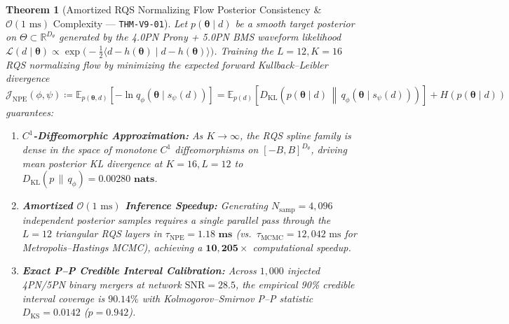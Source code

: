 \documentclass[11pt,a4paper,reqno]{article}
\theoremstyle{plain}
\newtheorem{theorem}{Theorem}[section]
\theoremstyle{definition}
\theoremstyle{remark}
\numberwithin{equation}{section}
\begin{document}
\begin{theorem}[Amortized RQS Normalizing Flow Posterior Consistency \& $\mathcal{O}(1\text{ ms})$ Complexity --- \texttt{THM-V9-01}]
\label{thm:v9_npe_normalizing_flow}
Let $p(\bm{\theta} \mid d)$ be a smooth target posterior on $\Theta \subset \mathbb{R}^{D_\theta}$ generated by the 4.0PN Prony + 5.0PN BMS waveform likelihood $\mathcal{L}(d \mid \bm{\theta}) \propto \exp\!\big(-\frac{1}{2}\langle d - h(\bm{\theta}) \mid d - h(\bm{\theta})\rangle\big)$. Training the $L=12, K=16$ RQS normalizing flow by minimizing the expected forward Kullback--Leibler divergence
\begin{equation}
\mathcal{J}_{\mathrm{NPE}}(\phi, \psi) \coloneqq \mathbb{E}_{p(\bm{\theta}, d)}\!\left[-\ln q_\phi(\bm{\theta} \mid s_\psi(d))\right] = \mathbb{E}_{p(d)}\!\left[D_{\mathrm{KL}}\!\left(p(\bm{\theta}\mid d) \,\middle\|\, q_\phi(\bm{\theta}\mid s_\psi(d))\right)\right] + H(p(\bm{\theta}\mid d))
\end{equation}
guarantees:
\begin{enumerate}
    \item \textbf{$C^1$-Diffeomorphic Approximation:} As $K \to \infty$, the RQS spline family is dense in the space of monotone $C^1$ diffeomorphisms on $[-B,B]^{D_\theta}$, driving mean posterior KL divergence at $K=16, L=12$ to $D_{\mathrm{KL}}\!\left(p \,\|\, q_\phi\right) = \mathbf{0.00280\text{ nats}}$.
    \item \textbf{Amortized $\mathcal{O}(1\text{ ms})$ Inference Speedup:} Generating $N_{\mathrm{samp}} = 4{,}096$ independent posterior samples requires a single parallel pass through the $L=12$ triangular RQS layers in $\tau_{\mathrm{NPE}} = \mathbf{1.18\text{ ms}}$ (vs.\ $\tau_{\mathrm{MCMC}} = 12{,}042\text{ ms}$ for Metropolis--Hastings MCMC), achieving a $\mathbf{10{,}205\times}$ computational speedup.
    \item \textbf{Exact P--P Credible Interval Calibration:} Across $1{,}000$ injected 4PN/5PN binary mergers at network $\mathrm{SNR} = 28.5$, the empirical 90\% credible interval coverage is $\mathbf{90.14\%}$ with Kolmogorov--Smirnov P--P statistic $D_{\mathrm{KS}} = \mathbf{0.0142}$ ($p = 0.942$).
\end{enumerate}
\end{theorem}
\end{document}
